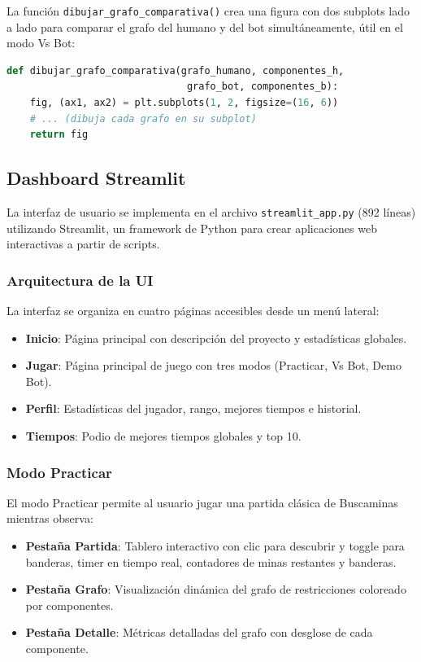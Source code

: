 \documentclass[12pt,a4paper]{article}
\begin{document}
La función \texttt{dibujar\_grafo\_comparativa()} crea una figura con dos subplots lado a lado para comparar el grafo del humano y del bot simultáneamente, útil en el modo Vs Bot:

\begin{lstlisting}[language=Python, caption={Visualización comparativa humano vs. bot.}]
def dibujar_grafo_comparativa(grafo_humano, componentes_h,
                               grafo_bot, componentes_b):
    fig, (ax1, ax2) = plt.subplots(1, 2, figsize=(16, 6))
    # ... (dibuja cada grafo en su subplot)
    return fig
\end{lstlisting}

\subsection{Dashboard Streamlit}

La interfaz de usuario se implementa en el archivo \texttt{streamlit\_app.py} (892 líneas) utilizando Streamlit, un framework de Python para crear aplicaciones web interactivas a partir de scripts.

\subsubsection{Arquitectura de la UI}

La interfaz se organiza en cuatro páginas accesibles desde un menú lateral:

\begin{itemize}[itemsep=2pt]
    \item \textbf{Inicio}: Página principal con descripción del proyecto y estadísticas globales.
    \item \textbf{Jugar}: Página principal de juego con tres modos (Practicar, Vs Bot, Demo Bot).
    \item \textbf{Perfil}: Estadísticas del jugador, rango, mejores tiempos e historial.
    \item \textbf{Tiempos}: Podio de mejores tiempos globales y top 10.
\end{itemize}

\subsubsection{Modo Practicar}

El modo Practicar permite al usuario jugar una partida clásica de Buscaminas mientras observa:

\begin{itemize}[itemsep=2pt]
    \item \textbf{Pestaña Partida}: Tablero interactivo con clic para descubrir y toggle para banderas, timer en tiempo real, contadores de minas restantes y banderas.
    \item \textbf{Pestaña Grafo}: Visualización dinámica del grafo de restricciones coloreado por componentes.
    \item \textbf{Pestaña Detalle}: Métricas detalladas del grafo con desglose de cada componente.
\end{itemize}
\end{document}
